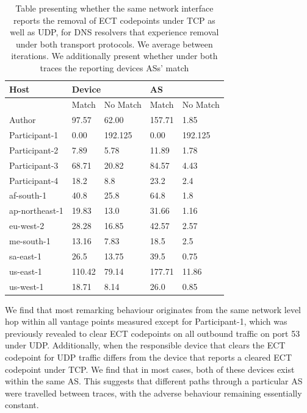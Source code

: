 \documentclass{l4proj}
\begin{document}
\begin{table}[H]
\centering
\begin{tabular}{|l|l|p{1cm}|l|p{1cm}|}
\hline
Host          & \multicolumn{2}{l|}{Device} & \multicolumn{2}{l|}{AS} \\ \hline
              & Match    & No \newline Match    & Match  & No \newline Match  \\ \hline
Author        & 97.57     & 62.00            & 157.71      & 1.85        \\ \hline
Participant-1 & 0.00     & 192.125            & 0.00      & 192.125        \\ \hline
Participant-2 & 7.89      & 5.78            & 11.89      & 1.78         \\ \hline
Participant-3 & 68.71     & 20.82            & 84.57      & 4.43        \\ \hline
Participant-4 & 18.2      & 8.8            & 23.2      & 2.4         \\ \hline
af-south-1        & 40.8     & 25.8            & 64.8      & 1.8        \\ \hline
ap-northeast-1 & 19.83     & 13.0            & 31.66      & 1.16        \\ \hline
eu-west-2 & 28.28      & 16.85            & 42.57      & 2.57         \\ \hline
me-south-1 & 13.16     & 7.83            & 18.5      & 2.5        \\ \hline
sa-east-1 & 26.5      & 13.75            & 39.5      & 0.75         \\ \hline
us-east-1 & 110.42      &  79.14  & 177.71      & 11.86         \\ \hline
us-west-1 & 18.71      & 8.14         & 26.0      & 0.85         \\ \hline
\end{tabular}

\caption{Table presenting whether the same network interface reports the removal of ECT codepoints under TCP as well as UDP, for DNS resolvers that experience removal under both transport protocols. We average between iterations. We additionally present whether under both traces the reporting devices ASs' match}
\label{tab:udptcp}

\end{table}


We find that most remarking behaviour originates from the same network level hop within all vantage points measured except for Participant-1, which was previously revealed to clear ECT codepoints on all outbound traffic on port 53 under UDP. Additionally, when the responsible device that clears the ECT codepoint for UDP traffic differs from the device that reports a cleared ECT codepoint under TCP. We find that in most cases, both of these devices exist within the same AS. This suggests that different paths through a particular AS were travelled between traces, with the adverse behaviour remaining essentially constant.
\end{document}
